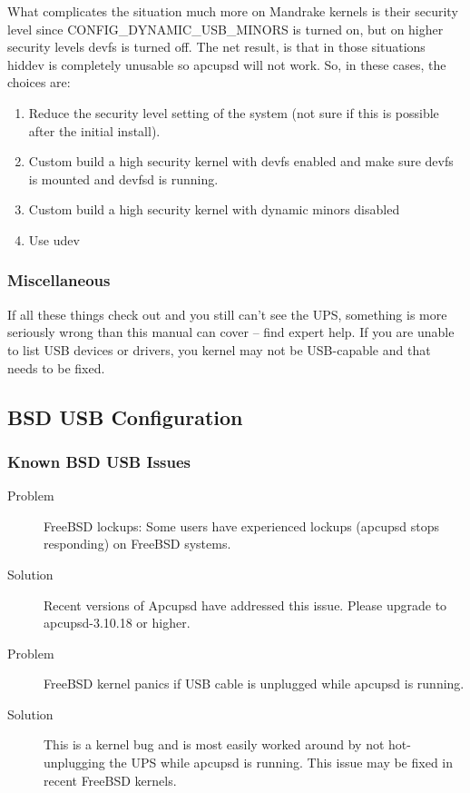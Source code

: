 What complicates the situation much more on Mandrake kernels is their security
level since CONFIG\_DYNAMIC\_USB\_MINORS is turned on, but on higher security
levels devfs is turned off. The net result, is that in those situations hiddev
is completely unusable so apcupsd will not work. So, in these cases,
the choices are: 

\begin{enumerate}
    \item Reduce the security level setting of the system (not sure if 
    this is possible after the initial install).
    \item Custom build a high security kernel with devfs enabled and make
    sure devfs is mounted and devfsd is running.
    \item Custom build a high security kernel with dynamic minors disabled
    \item Use udev
\end{enumerate}

\subsubsection*{Miscellaneous}

If all these things check out and you still can't see the UPS, something is
more seriously wrong than this manual can cover {--} find expert help.  If you
are unable to list USB devices or drivers, you kernel may not be USB-capable
and that needs to be fixed.


\subsection*{BSD USB Configuration}

\subsubsection*{Known BSD USB Issues}

\begin{description}
\item [Problem]
FreeBSD lockups: Some users have experienced lockups (apcupsd stops 
responding) on FreeBSD systems.
\item [Solution]
Recent versions of Apcupsd have addressed
this issue. Please upgrade to apcupsd-3.10.18 or higher.

\item [Problem]
FreeBSD kernel panics if USB cable is unplugged while apcupsd is running. 
\item [Solution]
This is a kernel bug and is most easily worked around by not hot- 
unplugging the UPS while apcupsd is running. This issue may be fixed in
recent FreeBSD kernels.
\end{description}

